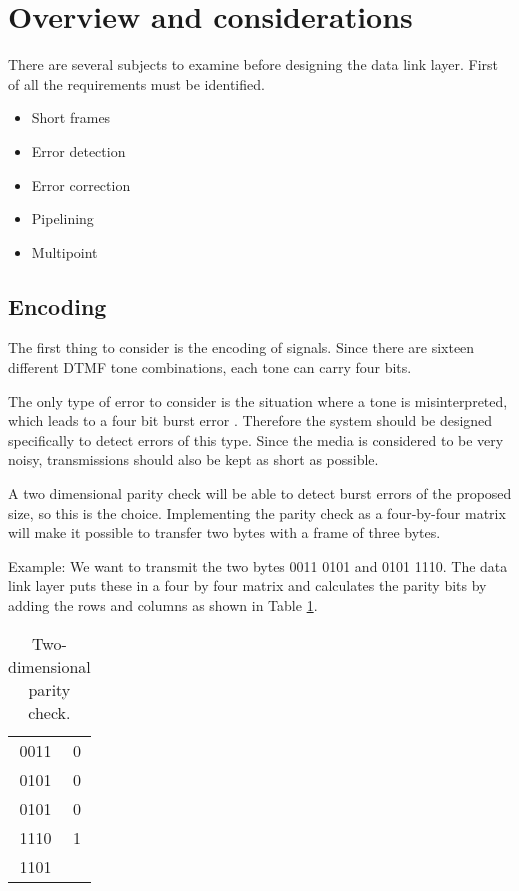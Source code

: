 \section{Overview and considerations}\label{sec:dll_theory}

There are several subjects to examine before designing the data link layer.
First of all the requirements must be identified. 
\begin{itemize}
	\item Short frames
	\item Error detection
	\item Error correction
	\item Pipelining
	\item Multipoint
\end{itemize}

\subsection{Encoding}
The first thing to consider is the encoding of signals. Since there are sixteen
different DTMF tone combinations, each tone can carry four bits.

The only type of error to consider is the situation where a tone is
misinterpreted, which leads to a four bit burst error \cite[267]{KOM}.
Therefore the system should be designed specifically to detect errors of this type. Since the media
is considered to be very noisy, transmissions should also be kept as short as
possible.

A two dimensional parity check will be able to detect burst errors of the
proposed size, so this is the choice. Implementing the parity check as a
four-by-four matrix will make it possible to transfer two bytes with a frame of
three bytes.

Example: We want to transmit the two bytes 0011 0101 and 0101 1110. The data
link layer puts these in a four by four matrix and calculates the parity bits by
adding the rows and columns as shown in Table \ref{tab:two_dimensional_parity_check}.

\begin{table}[htb]
	\centering
	\begin{tabular}{c|c}
	0011 & 0 \\
	0101 & 0 \\
	0101 & 0 \\
	1110 & 1 \\
	\hline
	1101 & \\
	\end{tabular}
	\caption{Two-dimensional parity check.}
	\label{tab:two_dimensional_parity_check}
\end{table}

